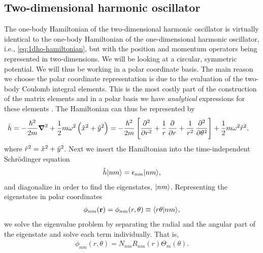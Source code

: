     \subsection{Two-dimensional harmonic oscillator}
        The one-body Hamiltonian of the two-dimensional harmonic oscillator is
        virtually identical to the one-body Hamiltonian of the one-dimensional
        harmonic oscillator, i.e., \autoref{eq:1dho-hamiltonian}, but with the
        position and momentum operators being represented in two-dimensions. We
        will be looking at a circular, symmetric potential. We will thus be
        working in a polar coordinate basis. The main reason we choose
        the polar coordinate representation is due to the evaluation of the
        two-body Coulomb integral elements. This is the most costly part of the
        construction of the matrix elements and in a polar basis we have
        \emph{analytical} expressions for these elements
        \cite{anisimovas1998energy}.  The Hamiltonian can thus be represented by
        \begin{align}
            \onehamil &= -\frac{\hslash^2}{2m}\vfg{\nabla}^2
            + \half m\omega^2\para{\position^2 + \position[y]^2}
            = -\frac{\hslash^2}{2m}\brak{
                \dpd[2]{}{r}
                + \frac{1}{r}\dpd[]{}{r}
                + \frac{1}{r^2}\dpd[2]{}{\theta}
            }
            + \half m \omega^2 \position[r]^2,
        \end{align}
        where $\position[r]^2 = \position^2 + \position[y]^2$. Next we insert
        the Hamiltonian into the time-independent Schrödinger equation
        \begin{align}
            \onehamil\ket{nm} = \epsilon_{nm}\ket{nm},
        \end{align}
        and diagonalize in order to find the eigenstates, $\ket{nm}$.
        Representing the eigenstates in polar coordinates
        \begin{align}
            \phi_{nm}(\vf{r}) = \phi_{nm}(r, \theta)
            \equiv \braket{r\theta}{nm},
        \end{align}
        we solve the eigenvalue problem by separating the radial and the angular
        part of the eigenstate and solve each term individually. That is,
        \begin{align}
            \phi_{nm}(r, \theta) = N_{nm}R_{nm}(r)\Theta_{m}(\theta).
            \label{eq:spf-2dqd}
        \end{align}
